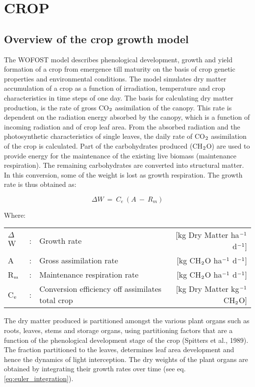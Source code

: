 \chapter{CROP}

\section{Overview of the crop growth model}

The WOFOST model describes phenological development, growth and yield formation of
a crop from emergence till maturity on the basis of crop genetic properties and 
environmental conditions. The model simulates dry matter accumulation of a crop as a function
of irradiation, temperature and crop characteristics in time steps of one day. 
The basis for calculating dry matter production, is the rate of gross CO$_{{\rm 2}}$ assimilation of
the canopy. This rate is dependent on the radiation energy absorbed by the canopy, which
is a function of incoming radiation and of crop leaf area. From the absorbed radiation and
the photosynthetic characteristics of single leaves, the daily rate of CO$_{{\rm 2}}$ assimilation of the
crop is calculated. Part of the carbohydrates produced (CH$_{{\rm 2}}$O) are used to provide energy
for the maintenance of the existing live biomass (maintenance respiration). The remaining
carbohydrates are converted into structural matter. In this conversion, some of the weight
is lost as growth respiration. The growth rate is thus obtained as:

\begin{equation}
\Delta W ~=~ C _{e} ~( A ~-~ R _{m} )
\end{equation}

Where:\\[5pt]
\begin{tabularx}{\textwidth}{llXr}
$\Delta$W &:& Growth rate    &   
    [kg Dry Matter ha$^{{\rm -1}}$ d$^{{\rm -1}}$]\\
A  &:& Gross assimilation   rate &  
    [kg CH$_{{\rm 2}}$O ha$^{{\rm -1}}$ d$^{{\rm -1}}$]\\
R$_{{\rm m}}$  &:& Maintenance respiration rate    &  
    [kg CH$_{{\rm 2}}$O ha$^{{\rm -1}}$ d$^{{\rm -1}}$]\\
C$_{{\rm e}}$ &:& Conversion efficiency off assimilates total crop   &   
    [kg Dry Matter kg$^{{\rm -1}}$ CH$_{{\rm 2}}$O]\\
\end{tabularx}

The dry matter produced is partitioned amongst the various plant organs such as roots,
leaves, stems and storage organs, using partitioning factors that are a function of the
phenological development stage of the crop (Spitters et al., 1989). The fraction partitioned
to the leaves, determines leaf area development and hence the dynamics of light interception. 
The dry weights of the plant organs are obtained by integrating their growth rates
over time (see eq. \ref{eq:euler_integration}).

